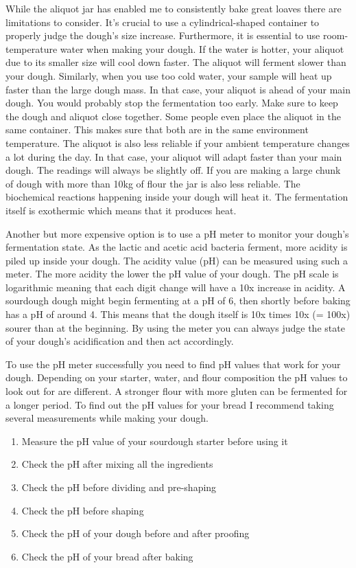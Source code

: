 While the aliquot jar has enabled me to consistently bake
great loaves there are limitations to consider. It's crucial
to use a cylindrical-shaped container to properly judge
the dough's size increase. Furthermore, it is essential
to use room-temperature water when making your dough. If the
water is hotter, your aliquot due to its smaller size
will cool down faster. The aliquot will ferment slower
than your dough. Similarly, when you use too cold water,
your sample will heat up faster than the large dough mass.
In that case, your aliquot is ahead of your main dough. You
would probably stop the fermentation too early. Make sure
to keep the dough and aliquot close together. Some people even
place the aliquot in the same container. This makes sure that
both are in the same environment temperature. The aliquot
is also less reliable if your ambient temperature changes
a lot during the day. In that case, your aliquot will adapt
faster than your main dough. The readings will always be slightly
off. If you are making a large chunk of dough with more
than 10kg of flour the jar is also less reliable. The biochemical
reactions happening inside your dough will heat it.
The fermentation itself is exothermic which means
that it produces heat.

Another but more expensive option is to use a pH meter
to monitor your dough's fermentation state. As the lactic
and acetic acid bacteria ferment, more acidity is piled
up inside your dough. The acidity value (pH) can be
measured using such a meter. The more acidity the lower the pH
value of your dough. The pH scale is logarithmic meaning
that each digit change will have a 10x increase in acidity.
A sourdough dough might begin fermenting at a pH of 6,
then shortly before baking has a pH of around 4. This means
that the dough itself is 10x times 10x (= 100x) sourer
than at the beginning. By using the meter you can always
judge the state of your dough's acidification and then act
accordingly.

To use the pH meter successfully you need to find pH values
that work for your dough. Depending on your starter,
water, and flour composition the pH values to look out
for are different. A stronger flour with more gluten
can be fermented for a longer period. To find out
the pH values for your bread I recommend taking
several measurements while making your dough.

\begin{enumerate}
  \item Measure the pH value of your sourdough starter before using it
  \item Check the pH after mixing all the ingredients
  \item Check the pH before dividing and pre-shaping
  \item Check the pH before shaping
  \item Check the pH of your dough before and after proofing
  \item Check the pH of your bread after baking
\end{enumerate}

